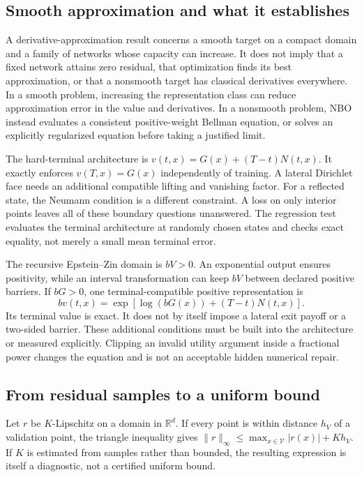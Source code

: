 \documentclass[ecta,draft]{econsocart}
\theoremstyle{definition}
\theoremstyle{remark}
\newcommand{\R}{\mathbb R}
\begin{document}
\subsection{Smooth approximation and what it establishes}
A derivative-approximation result concerns a smooth target on a compact domain and a family of networks whose capacity can increase. It does not imply that a fixed network attains zero residual, that optimization finds its best approximation, or that a nonsmooth target has classical derivatives everywhere. In a smooth problem, increasing the representation class can reduce approximation error in the value and derivatives. In a nonsmooth problem, NBO instead evaluates a consistent positive-weight Bellman equation, or solves an explicitly regularized equation before taking a justified limit.

The hard-terminal architecture is $v(t,x)=G(x)+(T-t)N(t,x)$. It exactly enforces $v(T,x)=G(x)$ independently of training. A lateral Dirichlet face needs an additional compatible lifting and vanishing factor. For a reflected state, the Neumann condition is a different constraint. A loss on only interior points leaves all of these boundary questions unanswered. The regression test evaluates the terminal architecture at randomly chosen states and checks exact equality, not merely a small mean terminal error.

The recursive Epstein--Zin domain is $bV>0$. An exponential output ensures positivity, while an interval transformation can keep $bV$ between declared positive barriers. If $bG>0$, one terminal-compatible positive representation is
\[
 bv(t,x)=\exp\left[\log(bG(x))+(T-t)N(t,x)\right].
\]
Its terminal value is exact. It does not by itself impose a lateral exit payoff or a two-sided barrier. These additional conditions must be built into the architecture or measured explicitly. Clipping an invalid utility argument inside a fractional power changes the equation and is not an acceptable hidden numerical repair.

\subsection{From residual samples to a uniform bound}
Let $r$ be $K$-Lipschitz on a domain in $\R^d$. If every point is within distance $h_V$ of a validation point, the triangle inequality gives $\|r\|_\infty\leq\max_{x\in\mathcal V}|r(x)|+Kh_V$. If $K$ is estimated from samples rather than bounded, the resulting expression is itself a diagnostic, not a certified uniform bound.
\end{document}
